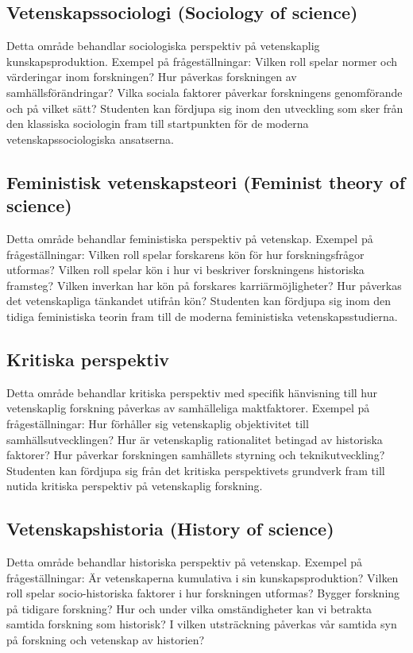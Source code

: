 \documentclass[12pt,a4paper]{article}
\begin{document}
\subsection{Vetenskapssociologi (Sociology of science)}
Detta område behandlar sociologiska perspektiv på vetenskaplig kunskapsproduktion. Exempel på frågeställningar: Vilken roll spelar normer och värderingar inom forskningen? Hur påverkas forskningen av samhällsförändringar? Vilka sociala faktorer påverkar forskningens genomförande och på vilket sätt? Studenten kan fördjupa sig inom den utveckling som sker från den klassiska sociologin fram till startpunkten för de moderna vetenskapssociologiska ansatserna. 

\subsection{Feministisk vetenskapsteori (Feminist theory of science)} 
Detta område behandlar feministiska perspektiv på vetenskap. Exempel på frågeställningar: Vilken roll spelar forskarens kön för hur forskningsfrågor utformas? Vilken roll spelar kön i hur vi beskriver forskningens historiska framsteg? Vilken inverkan har kön på forskares karriärmöjligheter? Hur påverkas det vetenskapliga tänkandet utifrån kön? Studenten kan fördjupa sig inom den tidiga feministiska teorin fram till de moderna feministiska vetenskapsstudierna. 

\subsection{Kritiska perspektiv}
Detta område behandlar kritiska perspektiv med specifik hänvisning till hur vetenskaplig forskning påverkas av samhälleliga maktfaktorer. Exempel på frågeställningar: Hur förhåller sig vetenskaplig objektivitet till samhällsutvecklingen? Hur är vetenskaplig rationalitet betingad av historiska faktorer? Hur påverkar forskningen samhällets styrning och teknikutveckling? Studenten kan fördjupa sig från det kritiska perspektivets grundverk fram till nutida kritiska perspektiv på vetenskaplig forskning. 

\subsection{Vetenskapshistoria (History of science)}
Detta område behandlar historiska perspektiv på vetenskap. Exempel på frågeställningar: Är vetenskaperna kumulativa i sin kunskapsproduktion? Vilken roll spelar socio-historiska faktorer i hur forskningen utformas? Bygger forskning på tidigare forskning? Hur och under vilka omständigheter kan vi betrakta samtida forskning som historisk? I vilken utsträckning påverkas vår samtida syn på forskning och vetenskap av historien? 
\end{document}
